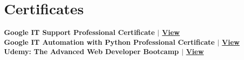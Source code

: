 \documentclass[letterpaper,11pt]{article}
\newcommand{\achievementItem}[1]{
  \item\small{
    {#1 \vspace{-6pt}}
  }
}
\begin{document}
 
\section{Certificates}
 \begin{itemize}[leftmargin=0.15in, label={}]
    \small{\item{
     \textbf{{Google IT Support Professional Certificate} $|$ \href{https://coursera.org/share/559ef9eba15de57964e3a61a85c78fc7}{View}} \\
     \textbf{{Google IT Automation with Python Professional Certificate} $|$ \href{http://coursera.org/verify/MR32ECWGGKRJ}{View}} \\
     \textbf{{Udemy: The Advanced Web Developer Bootcamp} $|$ \href{https://www.udemy.com/certificate/UC-3f33b66f-c557-41b0-8b72-43a44fb10625/}{View}} \\
    }}
 \end{itemize}






\end{document}
